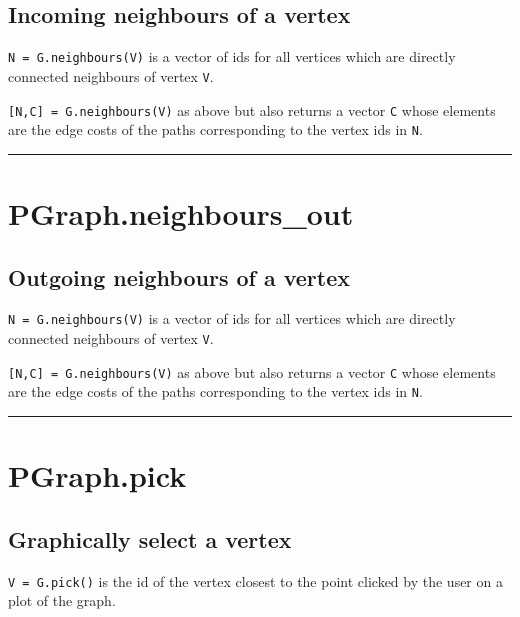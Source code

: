 \subsection*{Incoming neighbours of a vertex}


\texttt{N = G.neighbours(V)} is a vector of ids for all vertices which are
directly connected neighbours of vertex \texttt{V}.



\texttt{[N,C] = G.neighbours(V)} as above but also returns a vector \texttt{C} whose elements
are the edge costs of the paths corresponding to the vertex ids in \texttt{N}.

\vspace{1.5ex}\hrule

\hypertarget{PGraph.neighbours\_out}{\section*{PGraph.neighbours\_out}}
\subsection*{Outgoing neighbours of a vertex}


\texttt{N = G.neighbours(V)} is a vector of ids for all vertices which are
directly connected neighbours of vertex \texttt{V}.



\texttt{[N,C] = G.neighbours(V)} as above but also returns a vector \texttt{C} whose elements
are the edge costs of the paths corresponding to the vertex ids in \texttt{N}.

\vspace{1.5ex}\hrule

\hypertarget{PGraph.pick}{\section*{PGraph.pick}}
\subsection*{Graphically select a vertex}


\texttt{V = G.pick()} is the id of the vertex closest to the point clicked
by the user on a plot of the graph.


